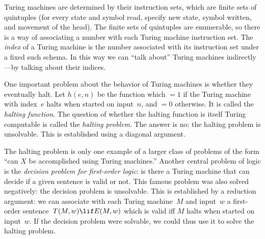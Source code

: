 Turing machines are determined by their instruction sets, which are
finite sets of quintuples (for every state and symbol read, specify
new state, symbol written, and movement of the head).  The finite sets
of quintuples are enumerable, so there is a way of associating a
number with each Turing machine instruction set.  The \emph{index} of
a Turing machine is the number associated with its instruction set
under a fixed such schema. In this way we can ``talk about'' Turing
machines indirectly---by talking about their indices.

One important problem about the behavior of Turing machines is whether
they eventually halt. Let $h(e, n)$ be the function which $= 1$ if the
Turing machine with index~$e$ halts when started on input~$n$, and
$=0$ otherwise. It is called the \emph{halting function}. The question
of whether the halting function is itself Turing computable is called
the \emph{halting problem}. The answer is no: the halting problem is
unsolvable.  This is established using a diagonal argument.

The halting problem is only one example of a larger class of problems
of the form ``can $X$ be accomplished using Turing machines.'' Another
central problem of logic is the \emph{decision problem for first-order
  logic}: is there a Turing machine that can decide if a given
sentence is valid or not.  This famous problem was also solved
negatively: the decision problem is unsolvable. This is established by
a reduction argument: we can associate with each Turing machine~$M$
and input~$w$ a first-order sentence~$T(M, w) \lif E(M, w)$ which is
valid iff $M$ halts when started on input~$w$. If the decision problem
were solvable, we could thus use it to solve the halting problem.
